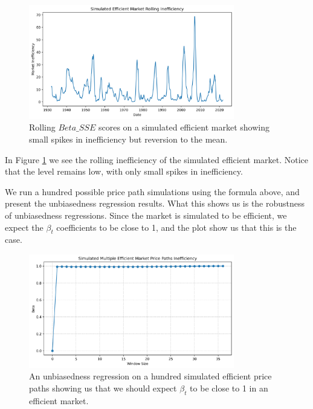 \begin{figure}[h!]
    \centering
    \includegraphics[width=0.8\textwidth]{../figs/Simulated Efficient Market Rolling Inefficiency.png}
    \caption{Rolling $Beta\_SSE$ scores on a simulated efficient market showing small spikes in inefficiency but reversion to the mean.}
    \label{fig:efficient_market}
\end{figure}

In Figure \ref{fig:efficient_market} we see the rolling inefficiency of the simulated efficient market.
Notice that the level remains low, with only small spikes in inefficiency.

We run a hundred possible price path simulations using the formula above, and present the unbiasedness regression results. 
What this shows us is the robustness of unbiasedness regressions. Since the market is simulated to be efficient, we expect the $\beta_t$ coefficients to be close to 1,
and the plot show us that this is the case.

\begin{figure}[h!]
    \centering
    \includegraphics[width=0.8\textwidth]{../figs/Simulated Multiple Efficient Market Price Paths Inefficiency.png}
    \caption{An unbiasedness regression on a hundred simulated efficient price paths showing us that we should expect $\beta_t$ to be close to 1 in an efficient market.}
    \label{fig:efficient_market_unbiasedness}
\end{figure}

